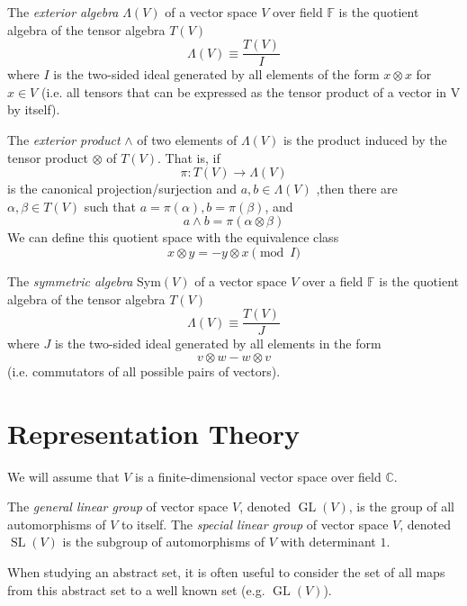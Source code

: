 \documentclass{article}
\DeclareMathOperator{\GL}{GL}
\DeclareMathOperator{\SL}{SL}
\begin{document}
  \begin{definition}
  The \textit{exterior algebra} $\Lambda(V)$ of a vector space $V$ over field $\mathbb{F}$ is the quotient algebra of the tensor algebra $T(V)$
  \[\Lambda(V) \equiv \frac{T(V)}{I}\]
  where $I$ is the two-sided ideal generated by all elements of the form $x \otimes x$ for $x \in V$ (i.e. all tensors that can be expressed as the tensor product of a vector in V by itself). 

  The \textit{exterior product} $\wedge$ of two elements of $\Lambda(V)$ is the product induced by the tensor product $\otimes$ of $T(V)$. That is, if 
  \[\pi: T(V) \longrightarrow \Lambda(V)\]
  is the canonical projection/surjection and $a, b \in \Lambda(V)$ ,then there are $\alpha, \beta \in T(V)$ such that $a = \pi(\alpha), b = \pi(\beta)$, and 
  \[a \wedge b = \pi(\alpha \otimes \beta)\]
  We can define this quotient space with the equivalence class
  \[x \otimes y = - y \otimes x \pmod{I}\]
  \end{definition}

  \begin{definition}
  The \textit{symmetric algebra} Sym$(V)$ of a vector space $V$ over a field $\mathbb{F}$ is the quotient algebra of the tensor algebra $T(V)$ 
  \[\Lambda(V) \equiv \frac{T(V)}{J}\]
  where $J$ is the two-sided ideal generated by all elements in the form 
  \[v \otimes w - w \otimes v\]
  (i.e. commutators of all possible pairs of vectors). 
  \end{definition}

\section{Representation Theory}

  We will assume that $V$ is a finite-dimensional vector space over field $\mathbb{C}$. 
  \begin{definition}
  The \textit{general linear group} of vector space $V$, denoted $\GL(V)$, is the group of all automorphisms of $V$ to itself. The \textit{special linear group} of vector space $V$, denoted $\SL(V)$ is the subgroup of automorphisms of $V$ with determinant $1$. 
  \end{definition}
  When studying an abstract set, it is often useful to consider the set of all maps from this abstract set to a well known set (e.g. $\GL(V)$). 
\end{document}
